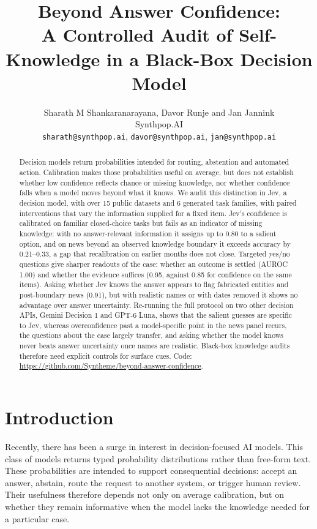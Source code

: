 \documentclass[10pt,twocolumn]{article}
\title{\Large\bfseries
Beyond Answer Confidence: \\ A Controlled Audit of Self-Knowledge in a Black-Box Decision  Model
}
\author{Sharath M Shankaranarayana, Davor Runje and Jan Jannink\\
\small Synthpop.AI\\
\small\texttt{sharath@synthpop.ai}, \texttt{davor@synthpop.ai},
\texttt{jan@synthpop.ai}}
\date{}
\begin{document}
\maketitle


\begin{abstract}
Decision models return probabilities intended for routing, abstention and
automated action. Calibration makes those probabilities useful on average,
but does not establish whether low confidence reflects chance or missing
knowledge, nor whether confidence falls when a model moves beyond what it
knows. We audit this distinction in Jev, a decision model, with over 15 public datasets and 6 generated task families,
with paired interventions that vary the information supplied for a fixed item.
Jev's confidence is calibrated on familiar closed-choice tasks but fails as an
indicator of missing knowledge: with no answer-relevant information it assigns
up to 0.80 to a salient option, and on news beyond an observed knowledge
boundary it exceeds accuracy by 0.21--0.33, a gap that recalibration on
earlier months does not close. Targeted yes/no questions give sharper
readouts of the case: whether an outcome is settled (AUROC 1.00) and whether
the evidence suffices (0.95, against 0.85 for confidence on the same items).
Asking whether Jev knows the answer appears to flag fabricated entities and
post-boundary news (0.91), but with realistic names or with dates removed it
shows no advantage over answer uncertainty. Re-running the full protocol on
two other decision APIs, Gemini Decision 1 and GPT-6 Luna, shows that the
salient guesses are specific to Jev, whereas overconfidence past a
model-specific point in the news panel recurs, the questions about the case
largely transfer, and asking whether the model knows never beats answer
uncertainty once names are realistic. Black-box knowledge audits
therefore need explicit controls for surface cues. Code:
\url{https://github.com/Syntheme/beyond-answer-confidence}.
\end{abstract}

\section{Introduction}
\label{sec:intro}


Recently, there has been a surge in interest in decision-focused AI models.
This class of models returns typed probability distributions rather than
free-form text. These probabilities are intended to support consequential
decisions: accept an answer, abstain, route the request to another system, or
trigger human review. Their usefulness therefore depends not only on average
calibration, but on whether they remain informative when the model lacks the
knowledge needed for a particular case.
\end{document}

